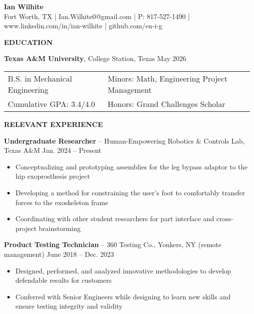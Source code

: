 \documentclass[18pt]{article}
\begin{document}
\begin{center}
    \LARGE \textbf{Ian Wilhite}\\ 
    \small Fort Worth, TX | Ian.Wilhite0@gmail.com | P: 817-527-1490 | www.linkedin.com/in/ian-wilhite | github.com/en-i-g
    
\end{center}

\begin{center}
    \textbf{EDUCATION}
    \hrulefill
\end{center}
\vspace{-0.5\baselineskip}
\textbf{Texas A\&M University}, College Station, Texas \hfill May 2026

\begin{tabular}{l|l} %
    B.S. in Mechanical Engineering \hspace*{1in} & Minors: Math, Engineering Project Management \\ 
    Cumulative GPA: 3.4/4.0 & Honors: Grand Challenges Scholar\\
\end{tabular}

\vspace{-0.5\baselineskip}
\begin{center}
    \textbf{RELEVANT EXPERIENCE}
    \hrulefill
\end{center}

\vspace{-0.5\baselineskip}
\textbf{Undergraduate Researcher} – Human-Empowering Robotics \& Controls Lab, Texas A\&M \hfill Jan. 2024 – Present

\begin{itemize}[noitemsep]
    \vspace{-0.75\baselineskip}
    \item Conceptualizing and prototyping assemblies for the leg bypass adaptor to the hip exoprosthesis project
    \item Developing a method for constraining the user’s foot to comfortably transfer forces to the exoskeleton frame
    \item Coordinating with other student researchers for part interface and cross-project brainstorming
\end{itemize}

\vspace{-0.5\baselineskip}
\textbf{Product Testing Technician} – 360 Testing Co., Yonkers, NY (remote management) \hfill June 2018 – Dec. 2023

\begin{itemize}[noitemsep]
    \vspace{-0.75\baselineskip}
    \item Designed, performed, and analyzed innovative methodologies to develop defendable results for customers
    \item Conferred with Senior Engineers while designing to learn new skills and ensure testing integrity and validity
\end{itemize}
\end{document}
